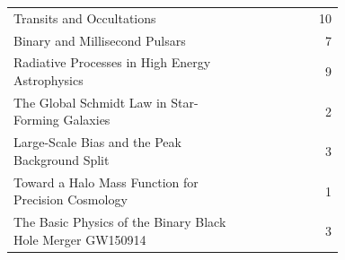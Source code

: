 \documentclass[10pt]{article}
\begin{document}
\begin{longtable}{@{}p{0.73\linewidth}rr@{}}
Transits and Occultations & \citep{winn2010} & 10 \\
Binary and Millisecond Pulsars & \citep{lorimer2008} & 7 \\
Radiative Processes in High Energy Astrophysics & \citep{ghisellini2012} & 9 \\
The Global Schmidt Law in Star-Forming Galaxies & \citep{kennicutt1997} & 2 \\
Large-Scale Bias and the Peak Background Split & \citep{sheth1999} & 3 \\
Toward a Halo Mass Function for Precision Cosmology & \citep{tinker2008} & 1 \\
The Basic Physics of the Binary Black Hole Merger GW150914 & \citep{ligo2016} & 3 \\
\end{longtable}
\end{document}
